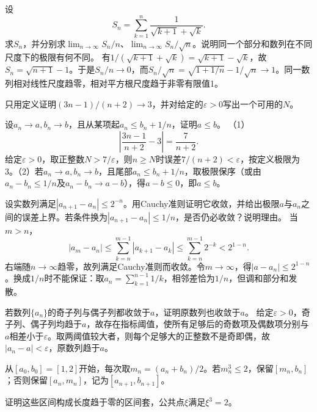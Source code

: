 设
\begin{equation*}
 S_n=\sum_{k=1}^n\frac1{\sqrt{k+1}+\sqrt k}.
\end{equation*}
求\(S_n\)，并分别求\(\lim_{n\to\infty}S_n/n\)、\(\lim_{n\to\infty}S_n/\sqrt n\)。说明同一个部分和数列在不同尺度下的极限有何不同。
\solutionanswer
有\(1/(\sqrt{k+1}+\sqrt k)=\sqrt{k+1}-\sqrt k\)，故\(S_n=\sqrt{n+1}-1\)。于是\(S_n/n\to0\)，而\(S_n/\sqrt n=\sqrt{1+1/n}-1/\sqrt n\to1\)。同一数列相对线性尺度趋零，相对平方根尺度趋于非零有限值1。


只用定义证明\((3n-1)/(n+2)\to3\)，并对给定的\(\varepsilon>0\)写出一个可用的\(N\)。

\quad {}设\(a_n\to a,b_n\to b\)，且从某项起\(a_n\le b_n+1/n\)，证明\(a\le b\)。
\solutionanswer
（1）\[\left|\frac{3n-1}{n+2}-3\right|=\frac7{n+2}.\]给定\(\varepsilon>0\)，取正整数\(N>7/\varepsilon\)，则\(n\ge N\)时误差\(7/(n+2)<\varepsilon\)，按定义极限为3。（2）若\(a_n\to a,b_n\to b\)，且尾部\(a_n\le b_n+1/n\)，取极限保序（或由\(a_n-b_n\le1/n\)及\(a_n-b_n\to a-b\)），得\(a-b\le0\)，即\(a\le b\)。


设实数列满足\(|a_{n+1}-a_n|\le2^{-n}\)。用Cauchy准则证明它收敛，并给出极限\(a\)与\(a_n\)之间的误差上界。若条件换为\(|a_{n+1}-a_n|\le1/n\)，是否仍必收敛？说明理由。
\solutionanswer
当\(m>n\)，
\[|a_m-a_n|\le\sum_{k=n}^{m-1}|a_{k+1}-a_k|\le\sum_{k=n}^{m-1}2^{-k}<2^{1-n}.\]
右端随\(n\to\infty\)趋零，故列满足Cauchy准则而收敛。令\(m\to\infty\)，得\(|a-a_n|\le2^{1-n}\)。换成\(1/n\)时不能保证：取\(a_n=\sum_{k=1}^{n-1}1/k\)，相邻差恰为\(1/n\)，但调和部分和发散。


若数列\(\{a_n\}\)的奇子列与偶子列都收敛于\(a\)，证明原数列也收敛于\(a\)。
\solutionanswer
给定\(\varepsilon>0\)，奇子列、偶子列均趋于\(a\)，故存在指标阈值，使所有足够后的奇数项及偶数项分别与\(a\)相差小于\(\varepsilon\)。取两阈值较大者，则每个足够大的正整数不是奇即偶，故\(|a_n-a|<\varepsilon\)，原数列趋于\(a\)。


从\([a_0,b_0]=[1,2]\)开始，每次取\(m_n=(a_n+b_n)/2\)。若\(m_n^3\le2\)，保留\([m_n,b_n]\)；否则保留\([a_n,m_n]\)，记为\([a_{n+1},b_{n+1}]\)。

\quad {}证明这些区间构成长度趋于零的区间套，公共点\(\xi\)满足\(\xi^3=2\)。

